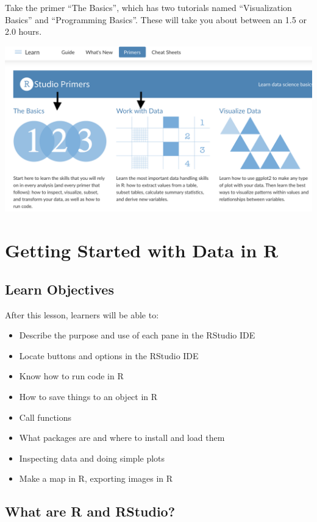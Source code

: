\documentclass[]{book}
\providecommand{\tightlist}{%
  \setlength{\itemsep}{0pt}\setlength{\parskip}{0pt}}
\begin{document}
Take the primer ``The Basics'', which has two tutorials named ``Visualization Basics'' and ``Programming Basics''. These will take you about between an 1.5 or 2.0 hours.

\includegraphics[width=400pt]{images/primers-todo}

\hypertarget{getting-started}{%
\chapter{Getting Started with Data in R}\label{getting-started}}

\hypertarget{learn-objectives}{%
\section{Learn Objectives}\label{learn-objectives}}

After this lesson, learners will be able to:

\begin{itemize}
\tightlist
\item
  Describe the purpose and use of each pane in the RStudio IDE
\item
  Locate buttons and options in the RStudio IDE
\item
  Know how to run code in R
\item
  How to save things to an object in R
\item
  Call functions
\item
  What packages are and where to install and load them
\item
  Inspecting data and doing simple plots
\item
  Make a map in R, exporting images in R
\end{itemize}

\hypertarget{r-RStudio}{%
\section{What are R and RStudio?}\label{r-RStudio}}
\end{document}
